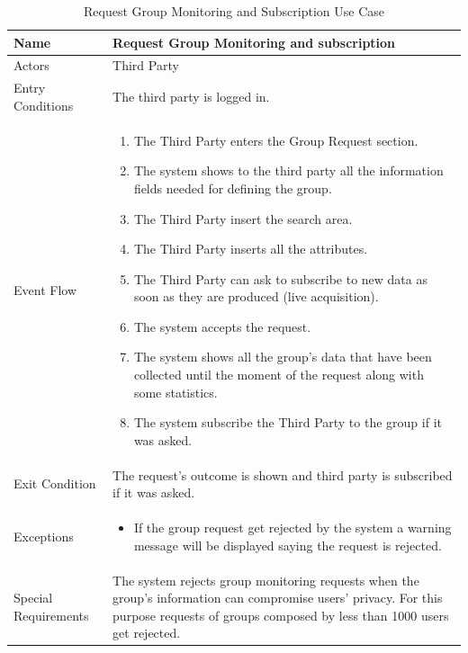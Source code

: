 \begin{enumerate}
\FloatBarrier
\begin{table}[h]
\begin{tabular}{|p{3.4cm}|p{}|}
\hline
Name             & Request Group Monitoring and subscription \\ \hline
Actors           & Third Party  \\ \hline
Entry Conditions & The third party is logged in.    \\ \hline
Event Flow       & \begin{enumerate}
            \item The Third Party enters the Group Request section.
            \item The system shows to the third party all the information fields needed for defining the group.
            \item The Third Party insert the search area.
            \item The Third Party inserts all the attributes.
            \item The Third Party can ask to subscribe to new data as soon as they are produced (live acquisition).
            \item The system accepts the request.
            \item The system shows all the group's data that have been collected until the moment of the request along with some statistics. 
            \item The system subscribe the Third Party to the group if it was asked. 
        \end{enumerate}\\ \hline
Exit Condition   & The request's outcome is shown and third party is subscribed if it was asked.\\ \hline
Exceptions       & \begin{itemize}
\item If the group request get rejected by the system a warning message will be displayed saying the request is rejected.
\end{itemize}\\ \hline
Special Requirements & The system rejects group monitoring requests when the group's information can compromise users' privacy. For this purpose requests of groups composed by less than 1000 users get rejected.
\\ \hline
\end{tabular}
\caption{Request Group Monitoring and Subscription Use Case}
\end{table}
\FloatBarrier
\clearpage



\end{enumerate}
